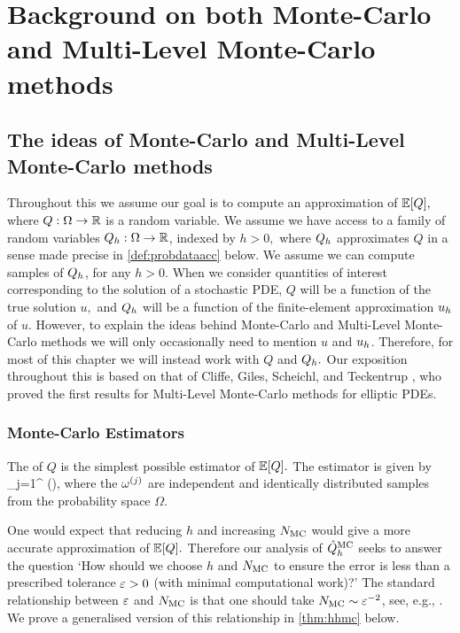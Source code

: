\section[Background on MC and MLMC]{Background on both Monte-Carlo and Multi-Level Monte-Carlo   methods}\label{sec:overview}
\subsection{The ideas of Monte-Carlo and Multi-Level Monte-Carlo methods}\label{sec:mlmcideasoverview}
Throughout this  we assume our goal is to compute an approximation of $\EXP{Q},$ where $Q:\Omega\rightarrow\mathbb R$ is a random variable. We assume we have access to a family of random variables $Q_{h}:\Omega\rightarrow\mathbb R$, indexed by $h>0,$ where $Q_{h}$ approximates $Q$ in a sense made precise in \cref{def:probdataacc} below. We assume we can compute samples of $Q_{h}$, for any $h>0$. When we consider quantities of interest corresponding to the solution of a stochastic PDE, $Q$ will be a function of the true solution $u,$ and $Q_{h}$ will be a function of the finite-element approximation $u_{h}$ of $u.$ However, to explain the ideas behind Monte-Carlo and Multi-Level Monte-Carlo methods we will only occasionally need to mention $u$ and $u_{h}$. Therefore, for most of this chapter we will instead work with $Q$ and $Q_{h}.$ Our exposition throughout this  is based on that of Cliffe, Giles, Scheichl, and Teckentrup \cite{ClGiScTe:11}, who proved the first results for Multi-Level Monte-Carlo methods for elliptic PDEs.

\subsubsection{Monte-Carlo Estimators}

The  of $Q$ is the simplest possible estimator of $\EXP{Q}.$ The estimator is given by
\beqs
\QhatMC \de {} \sum_{j=1}^{\NMC} \Qh\mleft(\omegasj\mright),
\eeqs
where the $\omega^{(j)}$ are independent and identically distributed samples from the probability space $\Omega$.

One would expect that reducing $h$ and increasing $N_{\mathrm{MC}}$ would give a more accurate approximation of $\EXP{Q}.$ Therefore our analysis of $\hat{Q}^{\mathrm{MC}}_{h}$ seeks to answer the question `How should we choose $h$ and $N_{\mathrm{MC}}$ to ensure the error is less than a prescribed tolerance $\varepsilon>0$ (with minimal computational work)?' The standard relationship between $\varepsilon$ and $N_{\mathrm{MC}}$ is that one should take $N_{\mathrm{MC}} \sim \varepsilon^{-2}$, see, e.g., \cite[Text after equation (3)]{ClGiScTe:11}. We prove a generalised version of this relationship in \cref{thm:hhmc} below.

